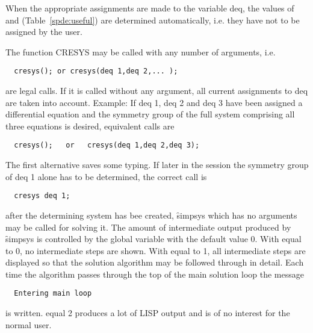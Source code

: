 When the appropriate assignments are made to the variable deq, the
values of  and  (Table~\ref{spde:useful}) are determined
automatically, i.e. they have not to be assigned by the user.

The function CRESYS may be called with any number of arguments, i.e.

\begin{verbatim}
  cresys(); or cresys(deq 1,deq 2,... );
\end{verbatim}

 are legal calls. If it is called without any argument, all current
assignments to deq are taken into account. Example: If deq 1, deq 2
and deq 3 have been assigned a differential equation and the symmetry
group of the full system comprising all three equations is desired,
equivalent calls are

\begin{verbatim}
  cresys();   or   cresys(deq 1,deq 2,deq 3);
\end{verbatim}

The first alternative saves some typing. If later in the session the
symmetry group of deq 1 alone has to be determined, the correct call
is

\begin{verbatim}
  cresys deq 1;
\end{verbatim}

after the determining system has bee created, \f{simpsys} which has no
arguments may be called for solving it. The amount of intermediate
output produced by \f{simpsys} is controlled by the global variable 
with the default value 0. With  equal to 0, no
intermediate steps are shown. With  equal to 1, all intermediate
steps are displayed so that the solution algorithm may be followed
 through in detail. Each time the algorithm
passes through the top of the main solution loop the message

\begin{verbatim}
  Entering main loop
\end{verbatim}

is written.  equal 2 produces a lot of LISP output and is of no
interest for the normal user.

